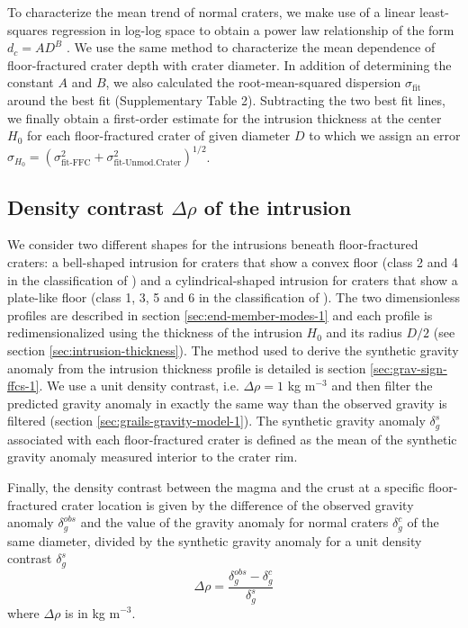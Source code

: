 To characterize  the mean trend  of normal craters,  we make use  of a
linear least-squares regression in log-log space to obtain a power law
relationship of the form $d_c=AD^B$ \citep{Pike:1974ux,Kalynn:2013fg}.
We  use  the  same  method  to characterize  the  mean  dependence  of
floor-fractured  crater depth  with crater  diameter.  In  addition of
determining  the  constant  $A$  and   $B$,  we  also  calculated  the
root-mean-squared dispersion $\sigma_{\text{fit}}$ around the best fit
(Supplementary  Table 2).   Subtracting  the two  best  fit lines,  we
finally obtain a  first-order estimate for the  intrusion thickness at
the center $H_0$ for each floor-fractured crater of given diameter $D$
to          which         we          assign         an          error
$\sigma_{H_0}
=(\sigma_{\text{fit-FFC}}^2+\sigma_{\text{fit-Unmod.Crater}}^2)^{1/2}$.

\subsection{Density contrast $\Delta \rho$ of the intrusion}
\label{sec:intr-dens-contr}

We  consider   two  different   shapes  for  the   intrusions  beneath
floor-fractured craters: a bell-shaped intrusion for craters that show
a   convex  floor   (class  2   and   4  in   the  classification   of
\citet{Schultz:1976kt}) and a cylindrical-shaped intrusion for craters
that  show  a   plate-like  floor  (class  1,  3,  5   and  6  in  the
classification  of  \citet{Schultz:1976kt}).   The  two  dimensionless
profiles  are described  in  section \ref{sec:end-member-modes-1}  and
each profile is redimensionalized using the thickness of the intrusion
$H_0$      and      its       radius      $D/2$      (see      section
\ref{sec:intrusion-thickness}).   The   method  used  to   derive  the
synthetic  gravity anomaly  from  the intrusion  thickness profile  is
detailed is section \ref{sec:grav-sign-ffcs-1}.  We use a unit density
contrast, i.e.   $\Delta \rho  = 1$  kg m$^{-3}$  and then  filter the
predicted gravity  anomaly in exactly  the same way than  the observed
gravity is  filtered (section  \ref{sec:grails-gravity-model-1}).  The
synthetic   gravity   anomaly   $\delta_g^s$  associated   with   each
floor-fractured crater is defined as the mean of the synthetic gravity
anomaly measured interior to the crater rim.
  
Finally, the  density contrast between  the magma  and the crust  at a
specific floor-fractured crater location is given by the difference of
the observed  gravity anomaly  $\delta_g^{obs}$ and  the value  of the
gravity anomaly for normal craters  $\delta_g^c$ of the same diameter,
divided by the  synthetic gravity anomaly for a  unit density contrast
$\delta_g^s$
\begin{equation}
  \Delta \rho = \frac{\delta_{g}^{obs}-\delta_{g}^c}{\delta_{g}^{s}}
\end{equation}
where $\Delta \rho$ is in kg m$^{-3}$.


